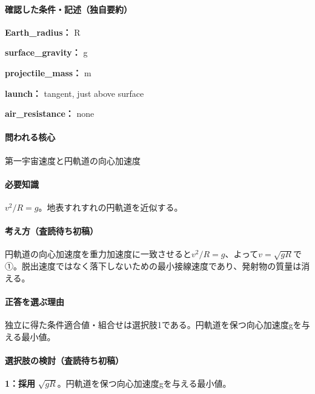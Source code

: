 \paragraph{確認した条件・記述（独自要約）}\mbox{}\par

\noindent\textbf{Earth\_radius：} R\par

\noindent\textbf{surface\_gravity：} g\par

\noindent\textbf{projectile\_mass：} m\par

\noindent\textbf{launch：} tangent, just above surface\par

\noindent\textbf{air\_resistance：} none\par

\paragraph{問われる核心} 第一宇宙速度と円軌道の向心加速度

\paragraph{必要知識} \(v^2/R=g\)。地表すれすれの円軌道を近似する。

\paragraph{考え方（査読待ち初稿）} 円軌道の向心加速度を重力加速度に一致させると\(v^2/R=g\)、よって\(v=\sqrt{gR}\)で①。脱出速度ではなく落下しないための最小接線速度であり、発射物の質量は消える。

\paragraph{正答を選ぶ理由} 独立に得た条件適合値・組合せは選択肢1である。円軌道を保つ向心加速度gを与える最小値。

\paragraph{選択肢の検討（査読待ち初稿）}\mbox{}\par

\noindent\textbf{1：採用} \(\sqrt{gR}\)。円軌道を保つ向心加速度gを与える最小値。\par

